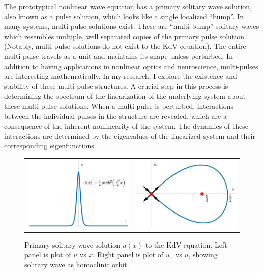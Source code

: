 \documentclass[12pt,reqno,oneside,hidelinks]{article}
\begin{document}
The prototypical nonlinear wave equation has a primary solitary wave solution, also known as a pulse solution, which looks like a single localized ``bump''. In many systems, multi-pulse solutions exist. These are ``multi-bump'' solitary waves which resembles multiple, well separated copies of the primary pulse solution. (Notably, multi-pulse solutions do not exist to the KdV equation). 
The entire multi-pulse travels as a unit and maintains its shape unless perturbed. In addition to having applications in nonlinear optics and neuroscience, multi-pulses are interesting mathematically. In my research, I explore the existence and stability of these multi-pulse structures. A crucial step in this process is determining the spectrum of the linearization of the underlying system about these multi-pulse solutions. When a multi-pulse is perturbed, interactions between the individual pulses in the structure are revealed, which are a consequence of the inherent nonlinearity of the system. The dynamics of these interactions are determined by the eigenvalues of the linearized system and their corresponding eigenfunctions.

\begin{figure}[H]
    \centering
    \begin{tabular}{cc}
        \includegraphics[width=6cm]{images/KdVsolitoneq.png} &
        \includegraphics[width=6cm]{images/KdVphaseportait.png} 
    \end{tabular}
    \caption{Primary solitary wave solution $u(x)$ to the KdV equation. Left panel is plot of $u$ vs $x$. Right panel is plot of $u_x$ vs $u$, showing solitary wave as homoclinic orbit. }
    \label{fig:kdvpp}
\end{figure}
\end{document}
